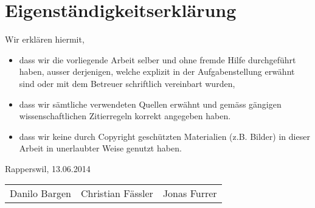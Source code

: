 \section{Eigenständigkeitserklärung}
Wir erklären hiermit, 
\begin{itemize}


\item	dass wir die vorliegende Arbeit selber und ohne fremde Hilfe durchgeführt haben, ausser derjenigen, welche explizit in der Aufgabenstellung erwähnt sind oder mit dem Betreuer schriftlich vereinbart wurden,
\item	dass wir sämtliche verwendeten Quellen erwähnt und gemäss gängigen wissenschaftlichen Zitierregeln korrekt angegeben haben.
\item dass wir keine durch Copyright geschützten Materialien (z.B. Bilder) in dieser Arbeit in unerlaubter Weise genutzt haben. 

\end{itemize}

Rapperswil, 13.06.2014


\begin{tabular}{lll}
Danilo Bargen & Christian Fässler & Jonas Furrer
\end{tabular} 